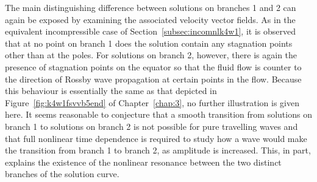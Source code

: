The main distinguishing difference between solutions on branches 1 and 2 can again be exposed by examining the associated velocity vector fields. As in the equivalent incompressible case of Section~\ref{subsec:incomnlk4w1}, it is observed that at no point on branch 1 does the solution contain any stagnation points other than at the poles. For solutions on branch 2, however, there is again the presence of stagnation points on the equator so that the fluid flow is counter to the direction of Rossby wave propagation at certain points in the flow. Because this behaviour is essentially the same as that depicted in Figure~\ref{fig:k4w1fsvvb5end} of Chapter~\ref{chap:3}, no further illustration is given here. It seems reasonable to conjecture that a smooth transition from solutions on branch 1 to solutions on branch 2 is not possible for pure travelling waves and that full nonlinear time dependence is required to study how a wave would make the transition from branch 1 to branch 2, as amplitude is increased. This, in part, explains the existence of the nonlinear resonance between the two distinct branches of the solution curve.

